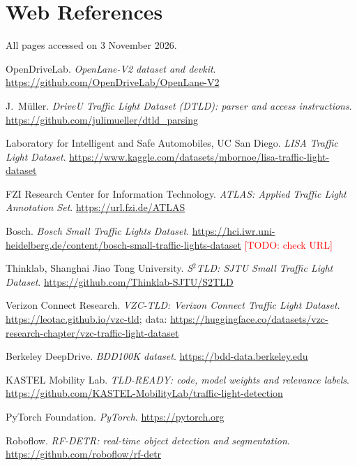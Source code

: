 \documentclass[12pt,a4paper,oneside]{report}
\newcommand{\todo}[1]{\textcolor{red}{[TODO: #1]}}
\newcommand{\webitem}[1]{\item\label{#1}}
\begin{document}
\hypersetup{pageanchor=false}

\hypersetup{pageanchor=true}


\tableofcontents
\listoffigures
\listoftables
\clearpage








\renewcommand{\bibname}{References}
\clearpage{}
{}



\chapter*{Web References}
All pages accessed on 3 November 2026.
{\raggedright
\begin{enumerate}[label={[W\arabic*]},leftmargin=1.4cm,itemsep=4pt]
  \webitem{web:openlanev2} OpenDriveLab. \emph{OpenLane-V2 dataset and devkit}.
        \url{https://github.com/OpenDriveLab/OpenLane-V2}
  \webitem{web:dtld} J.~Müller. \emph{DriveU Traffic Light Dataset (DTLD): parser and access
        instructions}. \url{https://github.com/julimueller/dtld_parsing}
  \webitem{web:lisa} Laboratory for Intelligent and Safe Automobiles, UC San Diego. \emph{LISA Traffic
        Light Dataset}. \url{https://www.kaggle.com/datasets/mbornoe/lisa-traffic-light-dataset}
  \webitem{web:atlas} FZI Research Center for Information Technology. \emph{ATLAS: Applied Traffic
        Light Annotation Set}. \url{https://url.fzi.de/ATLAS}
  \webitem{web:bstld} Bosch. \emph{Bosch Small Traffic Lights Dataset}.
        \url{https://hci.iwr.uni-heidelberg.de/content/bosch-small-traffic-lights-dataset}
        \todo{check URL}
  \webitem{web:s2tld} Thinklab, Shanghai Jiao Tong University. \emph{S$^2$TLD: SJTU Small Traffic
        Light Dataset}. \url{https://github.com/Thinklab-SJTU/S2TLD}
  \webitem{web:vzc} Verizon Connect Research. \emph{VZC-TLD: Verizon Connect Traffic Light Dataset}.
        \url{https://leotac.github.io/vzc-tld}; data:
        \url{https://huggingface.co/datasets/vzc-research-chapter/vzc-traffic-light-dataset}
  \webitem{web:bdd100k} Berkeley DeepDrive. \emph{BDD100K dataset}. \url{https://bdd-data.berkeley.edu}
  \webitem{web:tldready} KASTEL Mobility Lab. \emph{TLD-READY: code, model weights and relevance
        labels}. \url{https://github.com/KASTEL-MobilityLab/traffic-light-detection}
  \webitem{web:pytorch} PyTorch Foundation. \emph{PyTorch}. \url{https://pytorch.org}
  \webitem{web:rfdetr} Roboflow. \emph{RF-DETR: real-time object detection and segmentation}.
        \url{https://github.com/roboflow/rf-detr}\end{enumerate}
\par}

\appendix

\end{document}
